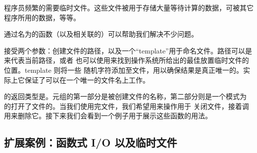 \documentclass[./main.tex]{subfiles}
\begin{document}
程序员频繁的需要临时文件。这些文件被用于存储大量等待计算的数据，可被其它程序所用的数据，等等。

通过名为的函数（以及相关联的）可以帮助我们解决不少问题。

接受两个参数：创建文件的路径，以及一个“template”用于命名文件。路径可以是来代表当前路径，或者
也可以使用来找到操作系统所给出的最佳放置临时文件的位置。template 则将一些
随机字符添加至文件，用以确保结果是真正唯一的。实际上它保证了可以在一个唯一的文件名上工作。

的返回类型是。元组的第一部分是被创建文件的名称，第二部分则是一个模式为
的打开了文件的。当我们使用完文件，我们希望用来操作用于
关闭文件，接着调用来删除它。接下来我们会看到一个例子用于展示这些函数的用法。

\subsection*{扩展案例：函数式 I/O 以及临时文件}
\end{document}
